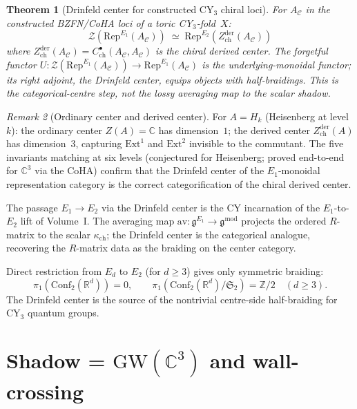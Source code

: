 \documentclass[11pt]{article}
\theoremstyle{plain}
\newtheorem{theorem}{Theorem}[section]
\theoremstyle{definition}
\theoremstyle{remark}
\newtheorem{remark}[theorem]{Remark}
\newcommand{\fg}{\mathfrak{g}}
\newcommand{\cC}{\mathcal{C}}
\newcommand{\cZ}{\mathcal{Z}}
\newcommand{\bC}{\mathbb{C}}
\newcommand{\bR}{\mathbb{R}}
\newcommand{\bZ}{\mathbb{Z}}
\newcommand{\Eone}{E_1}
\newcommand{\Etwo}{E_2}
\newcommand{\Zder}{Z^{\mathrm{der}}_{\mathrm{ch}}}
\newcommand{\Rep}{\mathrm{Rep}}
\newcommand{\Ext}{\mathrm{Ext}}
\newcommand{\GW}{\mathrm{GW}}
\newcommand{\Conf}{\mathrm{Conf}}
\begin{document}
\begin{theorem}[Drinfeld center for constructed CY$_3$ chiral loci]
\label{thm:v3-qg-drinfeld-center}
For $A_\cC$ in the constructed BZFN/CoHA loci of a toric
CY$_3$-fold~$X$:
\[
 \cZ(\Rep^{\Eone}(A_\cC))
 \;\simeq\;
 \Rep^{\Etwo}(\Zder(A_\cC))
\]
where $\Zder(A_\cC) = C^\bullet_{\mathrm{ch}}(A_\cC, A_\cC)$ is
the chiral derived center.  The forgetful functor
$U \colon \cZ(\Rep^{\Eone}(A_\cC)) \to \Rep^{\Eone}(A_\cC)$ is
the underlying-monoidal functor; its right adjoint, the Drinfeld
center, equips objects with half-braidings.  This is the
categorical-centre step, not the lossy averaging map to the scalar
shadow.
\end{theorem}

\begin{remark}[Ordinary center and derived center]
\label{rem:v3-qg-ordinary-vs-derived}
For $A = H_k$ (Heisenberg at level~$k$): the ordinary center
$Z(A) = \bC$ has dimension~$1$; the derived center
$\Zder(A)$ has dimension~$3$, capturing $\Ext^1$ and $\Ext^2$
invisible to the commutant.  The five invariants matching at six
levels (conjectured for Heisenberg; proved end-to-end for $\bC^3$
via the CoHA) confirm that the Drinfeld center of the
$\Eone$-monoidal representation category is the correct
categorification of the chiral derived center.
\end{remark}

The passage $\Eone \to \Etwo$ via the Drinfeld center is the CY
incarnation of the $\Eone$-to-$\Etwo$ lift of Volume~I.  The
averaging map $\mathrm{av} \colon \fg^{\Eone} \to
\fg^{\mathrm{mod}}$ projects the ordered $R$-matrix to the scalar
$\kappa_{\mathrm{ch}}$; the Drinfeld center is the categorical
analogue, recovering the $R$-matrix data as the braiding on the
center category.

Direct restriction from $E_d$ to $\Etwo$ (for $d \geq 3$) gives
only symmetric braiding:
\[
\pi_1(\Conf_2(\bR^d))=0,\qquad
\pi_1(\Conf_2(\bR^d)/\mathfrak S_2)=\bZ/2
\quad(d\ge3).
\]
The Drinfeld center is the source of the nontrivial centre-side
half-braiding for CY$_3$ quantum groups.



\section{Shadow = $\GW(\bC^3)$ and wall-crossing}
\label{sec:shadow-gw}
\end{document}
